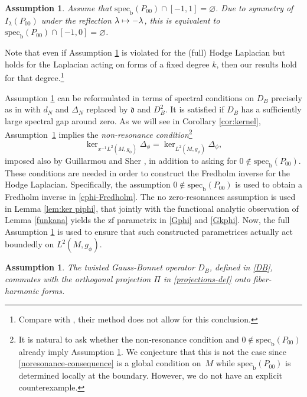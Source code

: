 \documentclass[11pt]{article}
\numberwithin{equation}{section}
\newcommand\mto{\mathchoice{\longmapsto}{\mapsto}{\mapsto}{\mapsto}}
\theoremstyle{plain}
\newtheorem{assum}[Th]{Assumption}
\theoremstyle{definition}
\newcommand{\bb}{{\mathrm{b}}}
\newcommand{\zf}{{\mathrm{zf}}}
\newcommand{\specb}{\mathrm{spec}_\bb}
\begin{document}
\begin{assum}\label{assum3}
Assume that $\specb(P_{00}) \cap[-1,1]=\varnothing$.
Due to symmetry of $I_\lambda(P_{00})$ under the reflection
$\lambda \mto - \lambda$, this is equivalent to $\specb(P_{00}) \cap[-1,0]=\varnothing$.
\end{assum}

Note that even if Assumption \ref{assum3} is violated for the (full) Hodge Laplacian but holds for
the Laplacian acting on forms of a fixed degree $k$, then our results hold for that degree.\footnote{Compare with \cite{kottke-rochon}, their method does not allow for this conclusion.}

Assumption \ref{assum3} can be reformulated in terms of spectral
conditions on $D_B$ precisely as in \cite[(21)]{guillarmou2014low}
with $d_N$ and $\Delta_N$ replaced by $\mathfrak{d}$ and $D^2_B$. It is satisfied if $D_B$ has a sufficiently large spectral gap around zero.
As we will see in Corollary \ref{cor:kernel}, Assumption~\ref{assum3} implies the \textit{non-resonance condition}\footnote{It is natural to ask whether the non-resonance condition and $0 \notin \specb(P_{00})$ already imply Assumption \ref{assum3}. We conjecture that this is not the case since \eqref{noresonance-consequence} is a global condition on~$M$ while $\specb(P_{00})$ is determined locally at the boundary. However, we do not have an explicit counterexample.}
\begin{equation}\label{noresonance-consequence}
\ker_{x^{-1}L^{2}(M,g_\phi) }\Delta_{\phi} = \ker_{L^{2}(M,g_\phi)}\Delta_{\phi},
\end{equation}
imposed also by Guillarmou and Sher \cite{guillarmou2014low}, in addition to asking for
$0 \notin \specb(P_{00})$. These conditions are needed in order to construct the Fredholm
inverse for the Hodge Laplacian. Specifically, the assumption $0 \notin \specb(P_{00})$
is used to obtain a Fredholm inverse in \eqref{cphi-Fredholm}.
The no zero-resonances assumption is used in Lemma \ref{lem:ker piphi}, that jointly with the functional
analytic observation of Lemma \ref{funkana} yields the $\zf$ parametrix in \eqref{Gphi}
and \eqref{Gkphi}. Now, the full Assumption \ref{assum3} is used to ensure that
such constructed parametrices actually act boundedly on $L^2(M,g_\phi)$.

\begin{assum}\label{assum4}
The twisted Gauss-Bonnet operator $D_B$, defined in \eqref{DB}, commutes with the orthogonal
projection $\Pi$ in \eqref{projections-def} onto fiber-harmonic forms.
\end{assum}
\end{document}
